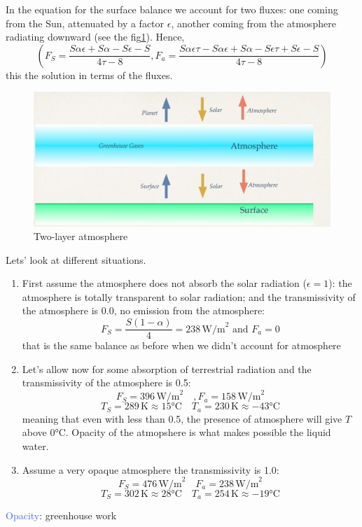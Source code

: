 In the equation for the surface balance we account for two fluxes: one coming from the Sun, attenuated by a factor $\epsilon$, another coming from the atmosphere radiating downward (see the fig\ref{fig:two layer}). 
Hence, 
\begin{equation}
    \left(F_S=\frac{S\alpha\epsilon+S\alpha-S\epsilon-S}{4\tau-8}, F_a=\frac{S\alpha\epsilon\tau-S\alpha\epsilon+S\alpha-S\epsilon\tau+S\epsilon-S}{4\tau-8}\right)
\end{equation}
this the solution in terms of the fluxes. 
\begin{figure}[h!]
    \centering
    \includegraphics[width=0.5\linewidth]{uploads/Screenshot 2024-11-20 114831.png}
    \caption{Two-layer atmosphere}
    \label{fig:two layer}
\end{figure}
Lets’ look at different situations. 
\begin{enumerate}
    \item First assume the atmosphere does not absorb the solar radiation ($\epsilon = 1$): the atmosphere is totally transparent to solar radiation; and the transmissivity of the atmosphere is 0.0, no emission from the atmosphere:
$$F_S=\frac{S(1-\alpha)}{4}=238 \,\text{W/m}^2 \,\,\text{and}\,\, F_a=0$$
    that is the same balance as before when we didn't account for atmosphere
    \item Let’s allow now for some absorption of terrestrial radiation and the transmissivity of the atmosphere is 0.5:
    $$F_S= 396 \,\text{W/m}^2 \quad, F_a=158 \, \text{W/m}^2$$
    $$T_S= 289 \,\text{K}\approx 15°\text{C} \quad T_a=230 \, \text{K}\approx -43°\text{C}$$
    meaning that even with less than 0.5, the presence of atmosphere will give $T$ above 0°C. Opacity of the atmopshere is what makes possible the liquid water. 
    \item Assume a very opaque atmosphere the transmissivity is 1.0:
    $$F_S=476 \,\text{W/m}^2 \quad F_a=238 \, \text{W/m}^2$$
    $$T_S= 302 \,\text{K}\approx 28°\text{C} \quad T_a=254 \, \text{K}\approx -19°\text{C}$$
\end{enumerate}
\textcolor{RoyalBlue}{Opacity}: greenhouse work %
